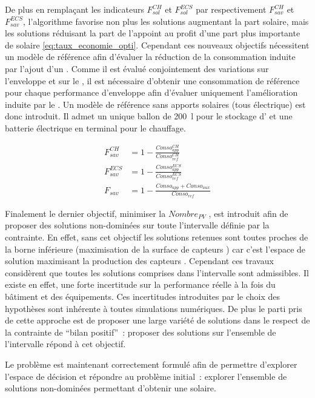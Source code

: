 De plus en remplaçant les indicateurs $F_{sol}^{CH}$ et $F_{sol}^{ECS}$ par respectivement
$F_{sav}^{CH}$ et $F_{sav}^{ECS}$, l’algorithme favorise non plus les solutions
augmentant la part solaire, mais les solutions réduisant la part de l’appoint au
profit d’une part plus importante de solaire \eqref{eq:taux_economie_opti}. Cependant ces nouveaux objectifs
nécessitent un modèle de référence afin d’évaluer la réduction de la consommation
induite par l’ajout d’un . Comme il est évalué conjointement des variations
sur l’enveloppe et sur le , il est nécessaire d’obtenir une consommation
de référence pour chaque performance d’enveloppe afin d’évaluer uniquement
l’amélioration induite par le . Un modèle de référence sans apports solaires
(tous électrique) est donc introduit. Il admet un unique ballon de \SI{200}{\litre} pour le stockage
d’ et une batterie électrique en terminal pour le chauffage.

\begin{align}\label{eq:taux_economie_opti}
  F_{sav}^{CH}   &= 1 - \frac{Conso_{app}^{CH}}{Conso_{ref}^{CH}} \\
  F_{sav}^{ECS}  &= 1 - \frac{Conso_{app}^{ECS}}{Conso_{ref}^{ECS}} \\
  F_{sav}        &= 1 - \frac{Conso_{app} + Conso_{aux}}{Conso_{ref}}
\end{align}

Finalement le dernier objectif, minimiser la $Nombre_{PV}$ , est introduit afin de proposer des solutions non-dominées
sur toute l’intervalle définie par la contrainte. En effet, sans cet objectif les solutions
retenues sont toutes proches de la borne inférieure (maximisation de la surface de capteurs )
car c’est l’espace de solution maximisant la production des capteurs . Cependant ces travaux considèrent que
toutes les solutions comprises dans l’intervalle sont admissibles. Il existe en effet,
une forte incertitude sur la performance réelle à la fois du bâtiment et des équipements. Ces
incertitudes introduites par le choix des hypothèses sont inhérente à toutes simulations numériques.
De plus le parti pris de cette approche est de proposer une large variété de solutions dans le
respect de la contrainte de \enquote{bilan positif}~: proposer des solutions
sur l’ensemble de l’intervalle répond à cet objectif.

Le problème est maintenant correctement formulé afin de permettre d’explorer l’espace de décision et
répondre au problème initial~: explorer l’ensemble de solutions non-dominées permettant
d’obtenir une  solaire.



